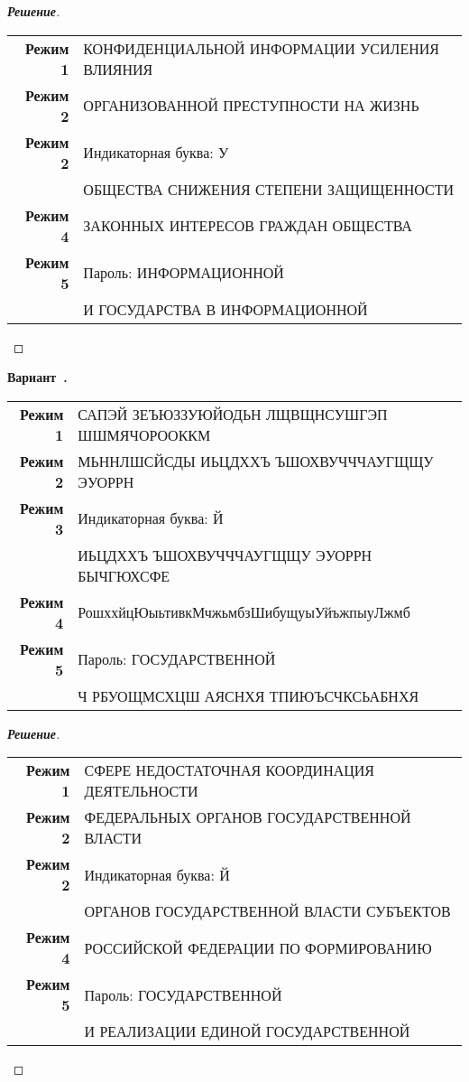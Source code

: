 \documentclass[a4paper,14pt]{extarticle}
\newcounter{exercise}[section]
\newenvironment{exercise}[1][]{\refstepcounter{exercise}\par\medskip
   \noindent\textbf{Вариант~\theexercise. #1}\\
   \noindent\makebox[\linewidth]{\rule{\textwidth}{1.25pt}}
   }
{\vspace{-2.5px}\mbox{}\newline \noindent\makebox[\linewidth]{\rule{\textwidth}{.5pt}}
}
\newenvironment{solution}
{\begin{proof}[\textbf{\textit{Решение}}]}
  {\end{proof}}
\begin{document}
\begin{solution}
\begin{table}[H]
	\centering
	\begin{tabular}{r l}\textbf{Режим 1}  & КОНФИДЕНЦИАЛЬНОЙ ИНФОРМАЦИИ УСИЛЕНИЯ ВЛИЯНИЯ \\ 
\textbf{Режим 2}  & ОРГАНИЗОВАННОЙ ПРЕСТУПНОСТИ НА ЖИЗНЬ \\ 
\textbf{Режим 2}  & Индикаторная буква: У \\ 
& ОБЩЕСТВА СНИЖЕНИЯ СТЕПЕНИ ЗАЩИЩЕННОСТИ \\ 
\textbf{Режим 4}  & ЗАКОННЫХ ИНТЕРЕСОВ ГРАЖДАН ОБЩЕСТВА \\ 
\textbf{Режим 5}  & Пароль: ИНФОРМАЦИОННОЙ \\ 
& И ГОСУДАРСТВА В ИНФОРМАЦИОННОЙ \\ 
	\end{tabular} 
\end{table}

\end{solution}
\begin{exercise}\begin{table}[H]
	\centering
	\begin{tabular}{r l}\textbf{Режим 1}  & САПЭЙ ЗЕЪЮЗЗУЮЙОДЬН ЛЩВЩНСУШГЭП ШШМЯЧОРООККМ \\ 
\textbf{Режим 2}  & МЬННЛШСЙСДЫ ИЬЦДХХЪ ЪШОХВУЧЧЧАУГЩЩУ ЭУОРРН \\ 
\textbf{Режим 3}  & Индикаторная буква: Й \\ 
& ИЬЦДХХЪ ЪШОХВУЧЧЧАУГЩЩУ ЭУОРРН БЫЧГЮХСФЕ \\ 
\textbf{Режим 4}  & РошххйцЮыьтивкМчжьмбзШибущуыУйъжпыуЛжмб \\ 
\textbf{Режим 5}  & Пароль: ГОСУДАРСТВЕННОЙ \\ 
& Ч РБУОЩМСХЦШ АЯСНХЯ ТПИЮЪСЧКСЬАБНХЯ \\ 
	\end{tabular} 
\end{table}

\end{exercise}
\begin{solution}
\begin{table}[H]
	\centering
	\begin{tabular}{r l}\textbf{Режим 1}  & СФЕРЕ НЕДОСТАТОЧНАЯ КООРДИНАЦИЯ ДЕЯТЕЛЬНОСТИ \\ 
\textbf{Режим 2}  & ФЕДЕРАЛЬНЫХ ОРГАНОВ ГОСУДАРСТВЕННОЙ ВЛАСТИ \\ 
\textbf{Режим 2}  & Индикаторная буква: Й \\ 
& ОРГАНОВ ГОСУДАРСТВЕННОЙ ВЛАСТИ СУБЪЕКТОВ \\ 
\textbf{Режим 4}  & РОССИЙСКОЙ ФЕДЕРАЦИИ ПО ФОРМИРОВАНИЮ \\ 
\textbf{Режим 5}  & Пароль: ГОСУДАРСТВЕННОЙ \\ 
& И РЕАЛИЗАЦИИ ЕДИНОЙ ГОСУДАРСТВЕННОЙ \\ 
	\end{tabular} 
\end{table}

\end{solution}
\end{document}
